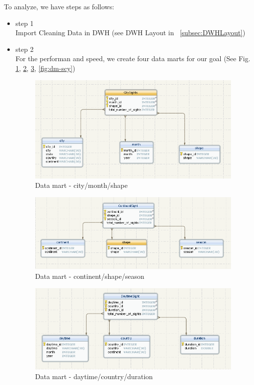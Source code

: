 \documentclass[11pt, journal]{IEEEtran}
\begin{document}
To analyze, we have steps as follows:
\begin{itemize}
    \item step 1\\
    Import Cleaning Data in DWH (see DWH Layout in ~\ref{subsec:DWHLayout})
    \item step 2\\
    For the performan and speed, we create four data marts for our goal (See Fig. \ref{fig:dm-cms}, \ref{fig:dm-css}, \ref{fig:dm-dcd}, \ref{fig:dm-scy})
      
    \begin{figure}[htb]
        \centering
            \includegraphics[width=1.0\columnwidth]{images/city-month-shape}
        \caption{Data mart - city/month/shape}
        \label{fig:dm-cms}
    \end{figure}

     \begin{figure}[htb]
            \centering
	            \includegraphics[width=1.0\columnwidth]{images/continent-shape-season}
            \caption{Data mart - continent/shape/season}
            \label{fig:dm-css}
        \end{figure}

     \begin{figure}[htb]
        \centering
            \includegraphics[width=1.0\columnwidth]{images/daytime-country-duration}
        \caption{Data mart - daytime/country/duration}
        \label{fig:dm-dcd}
    \end{figure}


\end{itemize}
\end{document}

